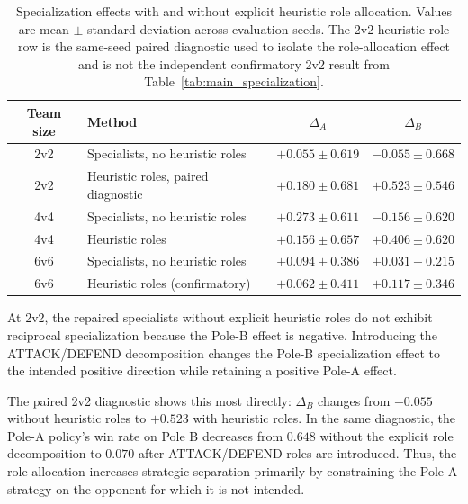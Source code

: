 \begin{table}[t]
\centering
\caption{Specialization effects with and without explicit heuristic role
allocation. Values are mean $\pm$ standard deviation across evaluation seeds.
The 2v2 heuristic-role row is the same-seed paired diagnostic used to isolate
the role-allocation effect and is not the independent confirmatory 2v2 result
from Table~\ref{tab:main_specialization}.}
\label{tab:role_baseline_comparison}
\begin{tabular}{c|l|cc}
\hline
Team size & Method & $\Delta_A$ & $\Delta_B$ \\
\hline
2v2
& Specialists, no heuristic roles
& $+0.055 \pm 0.619$
& $-0.055 \pm 0.668$ \\ %

2v2
& Heuristic roles, paired diagnostic
& $+0.180 \pm 0.681$
& $+0.523 \pm 0.546$ \\ %
\hline

4v4
& Specialists, no heuristic roles
& $+0.273 \pm 0.611$
& $-0.156 \pm 0.620$ \\ %

4v4
& Heuristic roles
& $+0.156 \pm 0.657$
& $+0.406 \pm 0.620$ \\ %
\hline

6v6
& Specialists, no heuristic roles
& $+0.094 \pm 0.386$
& $+0.031 \pm 0.215$ \\ %

6v6
& Heuristic roles (confirmatory)
& $+0.062 \pm 0.411$
& $+0.117 \pm 0.346$ \\ %
\hline
\end{tabular}
\end{table}

At 2v2, the repaired specialists without explicit heuristic roles do
not exhibit reciprocal specialization because the Pole-B effect is negative.
Introducing the ATTACK/DEFEND decomposition changes the Pole-B specialization
effect to the intended positive direction while retaining a positive Pole-A
effect.

The paired 2v2 diagnostic shows this most directly:
\(\Delta_B\) changes from \(-0.055\) without heuristic roles to \(+0.523\)
with heuristic roles. In the same diagnostic, the Pole-A policy's win rate on
Pole B decreases from \(0.648\) without the explicit role decomposition to
\(0.070\) after ATTACK/DEFEND roles are introduced. Thus, the role allocation
increases strategic separation primarily by constraining the Pole-A strategy
on the opponent for which it is not intended.

